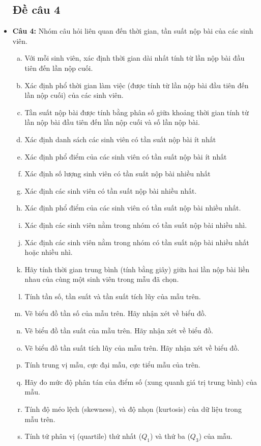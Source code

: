 \documentclass[a4paper]{article}
\theoremstyle{definition}
\begin{document}
\begin{itemize}
\subsection{Đề câu 4}
\item[] {\textbf{Câu 4: } Nhóm câu hỏi liên quan đến thời gian, tần suất nộp bài của các sinh viên.} 
\begin{enumerate}[a)]
  \item {Với mỗi sinh viên, xác định thời gian dài nhất tính từ lần nộp bài đầu tiên đến lần nộp cuối.}
  \item {Xác định phổ thời gian làm việc (được tính từ lần nộp bài đầu tiên đến lần nộp cuối) của các sinh viên.}
  \item {Tần suất nộp bài được tính bằng phân số giữa khoảng thời gian tính từ lần nộp bài đầu tiên đến lần nộp cuối và số lần nộp bài.}
  \item {Xác định danh sách các sinh viên có tần suất nộp bài ít nhất}
  \item {Xác định phổ điểm của các sinh viên có tần suất nộp bài ít nhất}
  \item {Xác định số lượng sinh viên có tần suất nộp bài nhiều nhất}
  \item {Xác định các sinh viên có tần suất nộp bài nhiều nhất.}
  \item {Xác định phổ điểm của các sinh viên có tần suất nộp bài nhiều nhất.}
  \item {Xác định các sinh viên nằm trong nhóm có tần suất nộp bài nhiều nhì.}
  \item {Xác định các sinh viên nằm trong nhóm có tần suất  nộp bài nhiều nhất hoặc nhiều nhì.}

  
  \item Hãy tính thời gian trung bình (tính bằng giây) giữa hai lần nộp bài liền nhau của cùng một sinh viên trong mẫu đã chọn.

  \item Tính tần số, tần suất và tần suất tích lũy của mẫu trên.
  \item Vẽ biểu đồ tần số của mẫu trên. Hãy nhận xét về biểu đồ.
  \item Vẽ biểu đồ tần suất của mẫu trên. Hãy nhận xét về biểu đồ.
  \item Vẽ biểu đồ tần suất tích lũy của mẫu trên. Hãy nhận xét về biểu đồ.
  \item Tính trung vị mẫu, cực đại mẫu, cực tiểu mẫu của trên.
  \item Hãy đo mức độ phân tán của điểm số (xung quanh giá trị trung bình) của  mẫu.
  \item  Tính độ méo lệch (skewness), và độ nhọn (kurtosis) của dữ liệu trong mẫu trên.
  \item Tính tứ phân vị (quartile) thứ nhất ($Q_1$) và thứ ba ($Q_3$) của mẫu.
    \end{enumerate}
              

\end{itemize}
\end{document}
